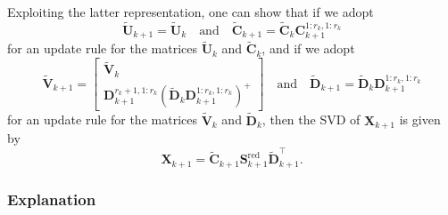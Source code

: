 \documentclass[11pt,a4paper]{article}
\newcommand{\0}{\M{0}}
\newcommand{\M}[1]{\mathbf{#1}}
\newcommand{\Mt}[1]{\tilde{\M{#1}}}
\newcommand{\Mr}[1]{{\M{#1}}^{\mathrm{red}}}
\newcommand{\T}{\top}
\begin{document}
Exploiting the latter representation, one can show that if we adopt
\begin{displaymath}
  \Mt{U}_{k+1} =  \Mt{U}_k
  \quad
  \text{and}
  \quad
  \Mt{C}_{k+1} = \Mt{C}_k \M{C}^{1:r_k, 1:r_k}_{k+1}
\end{displaymath}
for an update rule for the matrices $\Mt{U}_k$ and $\Mt{C}_k$, and if we adopt 
\begin{displaymath}
  \Mt{V}_{k+1}
  =
  \begin{bmatrix}
    \Mt{V}_k
    \\
   \M{D}^{r_k+1, 1:r_k}_{k+1}  
    \left(\Mt{D}_k \M{D}^{1:r_k,1:r_k}_{k+1}\right)^+
  \end{bmatrix}
  \quad
  \text{and}
  \quad
  \Mt{D}_{k+1}
  =
    \Mt{D}_k
  \M{D}^{1:r_k,1:r_k}_{k+1}
\end{displaymath}
for an update rule for the matrices $\Mt{V}_k$ and $\Mt{D}_k$, then
the SVD of $\M{X}_{k+1}$ is given by
\begin{displaymath}
  \M{X}_{k+1} = \Mt{C}_{k+1} \Mr{S}_{k+1} \Mt{D}^\T_{k+1}.
\end{displaymath}

\subsubsection{Explanation}
\end{document}
